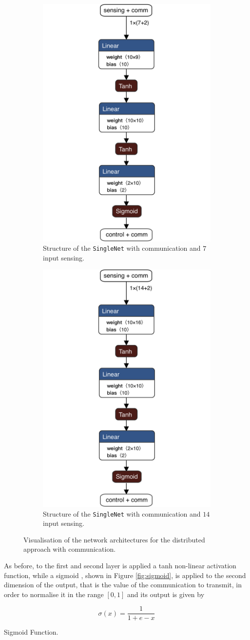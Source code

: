 \begin{figure}[H]
	\centering
	\begin{subfigure}[h]{0.495\textwidth}
		\centering
		\includegraphics[width=.3\textwidth]{contents/images/task1distributedcomm@4x}%
		\caption{Structure of the \texttt{SingleNet} with communication and $7$ 
		input sensing.}
	\end{subfigure}
	\hfill
	\begin{subfigure}[h]{0.495\textwidth}
		\centering
		\includegraphics[width=.3\textwidth]{contents/images/task1distributed_allcomm@4x}
		\caption{Structure of the \texttt{SingleNet} with communication and $14$ 
		input sensing.}
		\label{fig:singlenet14comm1}
	\end{subfigure}
	\caption[Network architectures for the distributed approach with 
	communication.]{Visualisation of the network architectures for the distributed 
	approach with communication.}
	\label{fig:singlenetcomm1}
\end{figure}

As before, to the first and second layer is applied a tanh non-linear activation 
function, while a sigmoid \cite[see][]{han1995influence}, shown in Figure 
\ref{fig:sigmoid}, is applied to the second dimension of the output, that is the 
value of the communication to transmit, in order to normalise it in the range $[0, 
1]$ and its output is given by
\begin{Equation}[htb]
	\centering
	\begin{equation}
	\sigma(x)= \frac{1}{1 + e - x}
	\end{equation}
	\caption{Sigmoid Function.}
	\label{eq:sigmoid}
\end{Equation}

